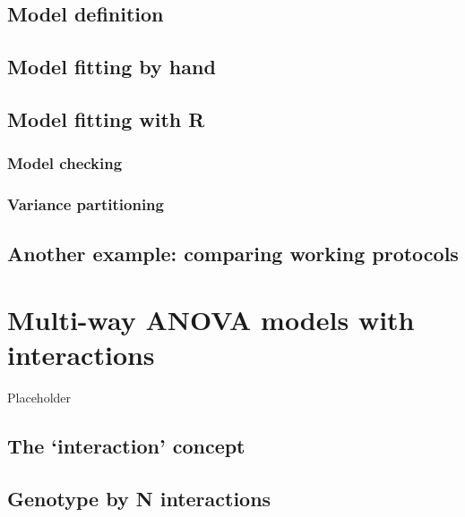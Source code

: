 \documentclass[a4paper,12pt,oneside]{book}
\begin{document}
\hypertarget{model-definition-1}{%
\section{Model definition}\label{model-definition-1}}

\hypertarget{model-fitting-by-hand}{%
\section{Model fitting by hand}\label{model-fitting-by-hand}}

\hypertarget{model-fitting-with-r}{%
\section{Model fitting with R}\label{model-fitting-with-r}}

\hypertarget{model-checking}{%
\subsection{Model checking}\label{model-checking}}

\hypertarget{variance-partitioning-1}{%
\subsection{Variance partitioning}\label{variance-partitioning-1}}

\hypertarget{another-example-comparing-working-protocols}{%
\section{Another example: comparing working protocols}\label{another-example-comparing-working-protocols}}

\hypertarget{multi-way-anova-models-with-interactions}{%
\chapter{Multi-way ANOVA models with interactions}\label{multi-way-anova-models-with-interactions}}

Placeholder

\hypertarget{the-interaction-concept}{%
\section{The `interaction' concept}\label{the-interaction-concept}}

\hypertarget{genotype-by-n-interactions}{%
\section{Genotype by N interactions}\label{genotype-by-n-interactions}}
\end{document}
